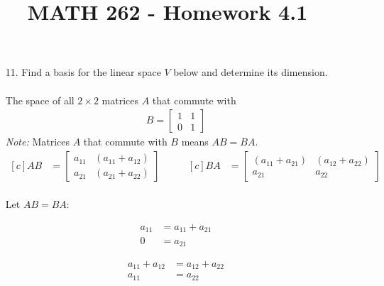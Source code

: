 \documentclass[letterpaper,12pt]{article}
\author{}
\title{MATH 262 - Homework 4.1}
\date{} %
\begin{document}
\maketitle

\begin{enumerate}
  \item[11.]
    Find a basis for the linear space $V$ below and determine its dimension. \\
    \\
    The space of all $2 \times 2$ matrices $A$ that commute with
    \begin{align*}
      B = \begin{bmatrix}
        1 & 1 \\
        0 & 1
      \end{bmatrix}
    \end{align*}
    \textit{Note:} Matrices $A$ that commute with $B$ means $AB = BA$. \\
    \begin{equation*}
      \begin{aligned}[c]
        AB &= \begin{bmatrix}
          a_{11} & (a_{11} + a_{12}) \\
          a_{21} & (a_{21} + a_{22})
        \end{bmatrix}
      \end{aligned}
      \qquad
      \begin{aligned}[c]
        BA &= \begin{bmatrix}
          (a_{11} + a_{21}) & (a_{12} + a_{22}) \\
          a_{21} & a_{22}
        \end{bmatrix}
      \end{aligned}
    \end{equation*} \\
    Let $AB = BA$: \\
    \begin{minipage}[t]{\dimexpr0.33\linewidth-.2pt}
      \begin{align*}
        a_{11} &= a_{11} + a_{21} \\
        0 &= a_{21}
      \end{align*}
    \end{minipage}%
    \begin{minipage}[t]{\dimexpr0.33\linewidth-.2pt}
      \begin{align*}
        a_{11} + a_{12} &= a_{12} + a_{22} \\
        a_{11} &= a_{22}

\end{align*}
\end{minipage}
\end{enumerate}
\end{document}
